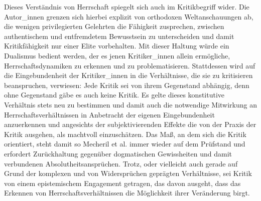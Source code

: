 Dieses Verständnis von Herrschaft
spiegelt sich auch im Kritikbegriff wider. Die Autor\_innen grenzen sich hierbei
explizit von orthodoxen Weltanschauungen ab, die wenigen privilegierten
Gelehrten die Fähigkeit zusprechen, zwischen authentischem und entfremdetem
Bewusstsein zu unterscheiden und damit Kritikfähigkeit nur einer Elite
vorbehalten. Mit dieser Haltung würde ein Dualismus bedient werden, der es
jenen Kritiker\_innen allein ermögliche, Herrschaftsdynamiken zu erkennen und zu
problematisieren. \footnotemark {} 
Stattdessen wird auf die Eingebundenheit der Kritiker\_innen
in die Verhältnisse, die sie zu kritisieren beanspruchen, verwiesen: Jede
Kritik sei von ihrem Gegenstand abhängig, denn ohne Gegenstand gäbe es auch
keine Kritik. Es gelte dieses konstitutive Verhältnis stets neu zu bestimmen
und damit auch die notwendige Mitwirkung an Herrschaftsverhältnissen in
Anbetracht der eigenen Eingebundenheit anzuerkennen und angesichts der
\glqq subjektivierenden Effekte \grqq \footnotemark {} die von der Praxis der Kritik ausgehen, als
machtvoll einzuschätzen. Das Maß, an dem sich die Kritik orientiert, steht
damit so Mecheril et al. immer wieder auf dem Prüfstand und erfordert
Zurückhaltung gegenüber dogmatischen Gewissheiten und damit verbundenen
Absolutheitsansprüchen.\footnotemark {} Trotz, oder vielleicht auch gerade auf Grund der
komplexen und von Widersprüchen geprägten Verhältnisse, sei Kritik von einem
epistemischem Engagement getragen, das davon ausgeht, dass das Erkennen von
Herrschaftsverhältnissen die Möglichkeit ihrer Veränderung birgt.\footnotemark
{}

